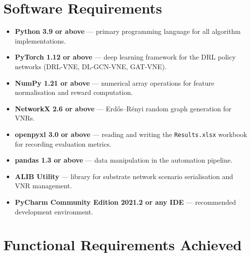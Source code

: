 \documentclass[12pt,a4paper]{report}
\begin{document}
\section{Software Requirements}

\begin{itemize}[leftmargin=*]
  \item \textbf{Python 3.9 or above} --- primary programming language for all algorithm
        implementations.
  \item \textbf{PyTorch 1.12 or above} --- deep learning framework for the DRL policy networks
        (DRL-VNE, DL-GCN-VNE, GAT-VNE).
  \item \textbf{NumPy 1.21 or above} --- numerical array operations for feature normalisation
        and reward computation.
  \item \textbf{NetworkX 2.6 or above} --- Erdős--Rényi random graph generation for VNRs.
  \item \textbf{openpyxl 3.0 or above} --- reading and writing the \texttt{Results.xlsx}
        workbook for recording evaluation metrics.
  \item \textbf{pandas 1.3 or above} --- data manipulation in the automation pipeline.
  \item \textbf{ALIB Utility} --- library for substrate network scenario serialisation and VNR
        management.
  \item \textbf{PyCharm Community Edition 2021.2 or any IDE} --- recommended development
        environment.
\end{itemize}

\section{Functional Requirements Achieved}
\end{document}
